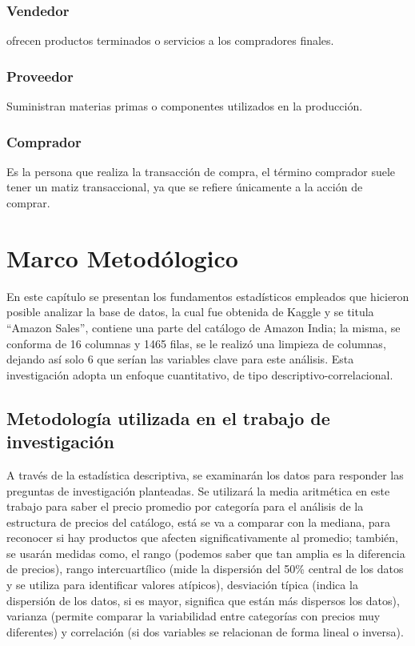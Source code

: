 \documentclass[oneside,11pt]{Latex/Classes/PhDthesisPSnPDF}
\begin{document}
\subsection{Vendedor }

ofrecen productos terminados o servicios a los compradores finales.\\

\subsection{Proveedor }

Suministran materias primas o componentes utilizados en la producción.\\

\subsection{Comprador }

Es la persona que realiza la transacción de compra, el término comprador
suele tener un matiz transaccional, ya que se refiere únicamente a la
acción de comprar.\\

\chapter{Marco Metodólogico}

En este capítulo se presentan los fundamentos estadísticos empleados que
hicieron posible analizar la base de datos, la cual fue obtenida de
Kaggle y se titula ``Amazon Sales'', contiene una parte del catálogo de
Amazon India; la misma, se conforma de 16 columnas y 1465 filas, se le
realizó una limpieza de columnas, dejando así solo 6 que serían las
variables clave para este análisis. Esta investigación adopta un enfoque
cuantitativo, de tipo descriptivo-correlacional.

\section{Metodología utilizada en el trabajo de investigación}

A través de la estadística descriptiva, se examinarán los datos para
responder las preguntas de investigación planteadas. Se utilizará la
media aritmética en este trabajo para saber el precio promedio por
categoría para el análisis de la estructura de precios del catálogo,
está se va a comparar con la mediana, para reconocer si hay productos
que afecten significativamente al promedio; también, se usarán medidas
como, el rango (podemos saber que tan amplia es la diferencia de
precios), rango intercuartílico (mide la dispersión del 50\% central de
los datos y se utiliza para identificar valores atípicos), desviación
típica (indica la dispersión de los datos, si es mayor, significa que
están más dispersos los datos), varianza (permite comparar la
variabilidad entre categorías con precios muy diferentes) y correlación
(si dos variables se relacionan de forma lineal o inversa).\\
\end{document}
